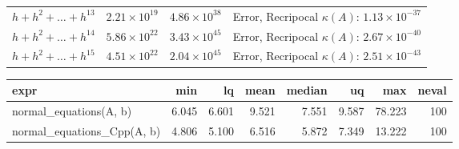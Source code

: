 \documentclass[
]{article}
\begin{document}
\begin{longtable}[]{@{}llll@{}}
\begin{minipage}[t]{0.17\columnwidth}
\(h+h^{2}+\dots+h^{13}\)\strut
\end{minipage} & \begin{minipage}[t]{0.16\columnwidth}\raggedright
\(2.21 \times 10^{19}\)\strut
\end{minipage} & \begin{minipage}[t]{0.16\columnwidth}\raggedright
\(4.86 \times 10^{38}\)\strut
\end{minipage} & \begin{minipage}[t]{0.40\columnwidth}\raggedright
Error, Recripocal \(\kappa(A)\): \(1.13 \times 10^{-37}\)\strut
\end{minipage}\tabularnewline
\begin{minipage}[t]{0.17\columnwidth}\raggedright
\(h+h^{2}+\dots+h^{14}\)\strut
\end{minipage} & \begin{minipage}[t]{0.16\columnwidth}\raggedright
\(5.86 \times 10^{22}\)\strut
\end{minipage} & \begin{minipage}[t]{0.16\columnwidth}\raggedright
\(3.43 \times 10^{45}\)\strut
\end{minipage} & \begin{minipage}[t]{0.40\columnwidth}\raggedright
Error, Recripocal \(\kappa(A)\): \(2.67 \times 10^{-40}\)\strut
\end{minipage}\tabularnewline
\begin{minipage}[t]{0.17\columnwidth}\raggedright
\(h+h^{2}+\dots+h^{15}\)\strut
\end{minipage} & \begin{minipage}[t]{0.16\columnwidth}\raggedright
\(4.51 \times 10^{22}\)\strut
\end{minipage} & \begin{minipage}[t]{0.16\columnwidth}\raggedright
\(2.04 \times 10^{45}\)\strut
\end{minipage} & \begin{minipage}[t]{0.40\columnwidth}\raggedright
Error, Recripocal \(\kappa(A)\): \(2.51 \times 10^{-43}\)\strut
\end{minipage}\tabularnewline
\bottomrule
\end{longtable}

\begin{longtable}[]{@{}lrrrrrrr@{}}
\toprule
expr & min & lq & mean & median & uq & max & neval\tabularnewline
\midrule
\endhead
normal\_equations(A, b) & 6.045 & 6.601 & 9.521 & 7.551 & 9.587 & 78.223
& 100\tabularnewline
normal\_equations\_Cpp(A, b) & 4.806 & 5.100 & 6.516 & 5.872 & 7.349 &
13.222 & 100\tabularnewline
\bottomrule
\end{longtable}
\end{document}
